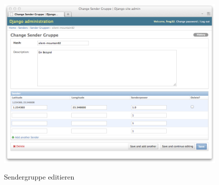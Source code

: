 \begin{figure}[H]
	\centering			      
        \includegraphics[scale=0.3]{images/group-edit.png}\\
		\caption{Sendergruppe editieren}
	\label{fig:group-edit}
\end{figure}

